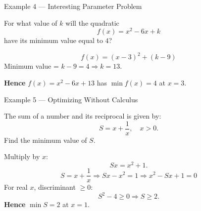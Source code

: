 \documentclass[12pt]{beamer}
\begin{document}




\begin{frame}{Example 4 — Interesting Parameter Problem}

For what value of $k$ will the quadratic
\[
f(x) = x^2 - 6x + k
\]
have its minimum value equal to $4$?

\pause
\[
f(x) = (x-3)^2 + (k - 9)
\]
Minimum value = $k - 9 = 4 \Rightarrow k = 13$.

\textbf{Hence } $f(x) = x^2 - 6x + 13$ has $\min f(x) = 4$ at $x = 3$.

\end{frame}

\begin{frame}{Example 5 — Optimizing Without Calculus}

The sum of a number and its reciprocal is given by:
\[
S = x + \frac{1}{x}, \quad x>0.
\]
Find the minimum value of $S$.

\pause
Multiply by $x$: 
\[
Sx = x^2 + 1.
\]
\[
S = x + \frac{1}{x} \Rightarrow Sx - x^2 = 1
\Rightarrow x^2 - Sx + 1 = 0
\]
For real $x$, discriminant $\ge 0$:
\[
S^2 - 4 \ge 0 \Rightarrow S \ge 2.
\]
\textbf{Hence } $\min S = 2$ at $x = 1$.

\end{frame}
\end{document}
